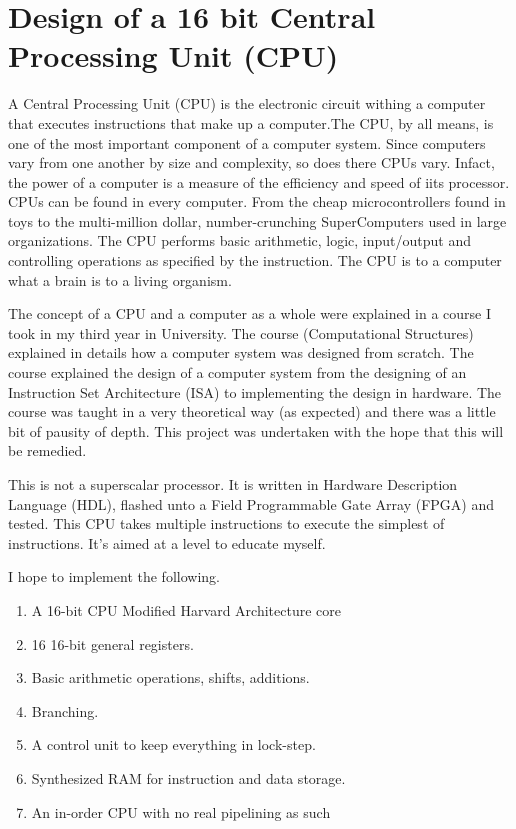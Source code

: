\section[CPU]{Design of a 16 bit Central Processing Unit (CPU)} 
A Central Processing Unit (CPU) is the electronic circuit withing a computer that executes instructions that make up a computer.The CPU, by all means, is one of the most important component of a computer system. Since computers vary from one another by size and complexity, so does there CPUs vary. Infact, the power of a computer is a measure of the efficiency and speed of iits processor. CPUs can be found in every computer. From the cheap microcontrollers found in toys to the multi-million dollar, number-crunching SuperComputers used in large organizations.  The CPU performs basic arithmetic, logic, input/output and controlling operations as specified by the instruction. The CPU is to a computer what a brain is to a living organism.

The concept of a CPU and a computer as a whole were explained in a course I took in my third year in University. The course (Computational Structures) explained in details how a computer system was designed from scratch. The course explained the design of a computer system from  the designing of an Instruction Set Architecture (ISA) to implementing the design in hardware. The course was taught in a very theoretical way (as expected) and there was a little bit of pausity of depth. This project was undertaken with the hope that this will be remedied.

This is not a superscalar processor. It is written in Hardware Description Language (HDL), flashed unto a Field Programmable Gate Array (FPGA) and tested. This CPU takes multiple instructions to execute the simplest of instructions. It’s aimed at a level to educate myself.

I hope to implement the following.
\begin{enumerate}
\item A 16-bit CPU Modified Harvard Architecture core
\item 16 16-bit general registers.
\item Basic arithmetic operations, shifts, additions.
\item Branching.
\item A control unit to keep everything in lock-step.
\item Synthesized RAM for instruction and data storage.
\item An in-order CPU with no real pipelining as such
\end{enumerate}

